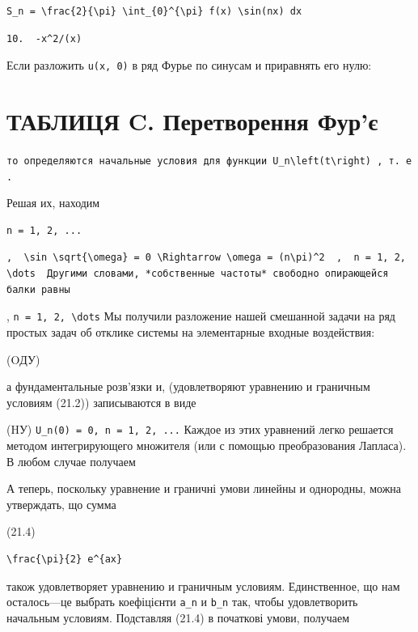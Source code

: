 \documentclass[
  ukrainian,
]{article}
\begin{document}
\begin{verbatim}
S_n = \frac{2}{\pi} \int_{0}^{\pi} f(x) \sin(nx) dx
\end{verbatim}

\begin{verbatim}
10.  -x^2/(x) 
\end{verbatim}

Если разложить \texttt{u(x,\ 0)} в ряд Фурье по синусам и приравнять его
нулю:

\section{ТАБЛИЦЯ C. Перетворення
Фур'є}\label{ux442ux430ux431ux43bux438ux446ux44f-c.-ux43fux435ux440ux435ux442ux432ux43eux440ux435ux43dux43dux44f-ux444ux443ux440ux454}

\texttt{то\ определяются\ начальные\ условия\ для\ функции\ \textquotesingle{}U\_n\textbackslash{}left(t\textbackslash{}right)\textquotesingle{}\ ,\ т.\ е.}

Решая их, находим

\begin{verbatim}
n = 1, 2, ...
\end{verbatim}

\begin{verbatim}
,  \sin \sqrt{\omega} = 0 \Rightarrow \omega = (n\pi)^2  ,  n = 1, 2, \dots  Другими словами, *собственные частоты* свободно опирающейся балки равны
\end{verbatim}

, \texttt{n\ =\ 1,\ 2,\ \textbackslash{}dots} Мы получили разложение
нашей смешанной задачи на ряд простых задач об отклике системы на
элементарные входные воздействия:

(OДУ)

а фундаментальные розв'язки и, (удовлетворяют уравнению и граничным
условиям (21.2)) записываются в виде

(HУ) \texttt{U\_n(0)\ =\ 0,\ n\ =\ 1,\ 2,\ ...} Каждое из этих уравнений
легко решается методом интегрирующего множителя (или с помощью
преобразования Лапласа). В любом случае получаем

А теперь, поскольку уравнение и граничні умови линейны и однородны,
можна утверждать, що сумма

(21.4)

\begin{verbatim}
\frac{\pi}{2} e^{ax}
\end{verbatim}

також удовлетворяет уравнению и граничным условиям. Единственное, що нам
осталось---це выбрать коефіцієнти \texttt{a\_n} и \texttt{b\_n} так,
чтобы удовлетворить начальным условиям. Подставляя (21.4) в початкові
умови, получаем
\end{document}

